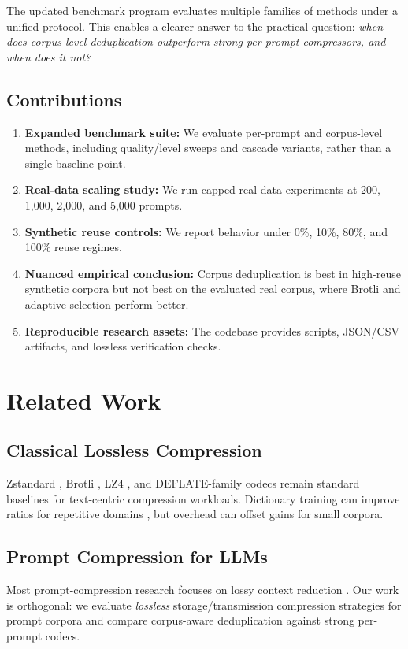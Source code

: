 \documentclass[10pt,conference]{IEEEtran}
\begin{document}
The updated benchmark program evaluates multiple families of methods under a unified protocol. This enables a clearer answer to the practical question: \textit{when does corpus-level deduplication outperform strong per-prompt compressors, and when does it not?}

\subsection{Contributions}
\begin{enumerate}
    \item \textbf{Expanded benchmark suite:} We evaluate per-prompt and corpus-level methods, including quality/level sweeps and cascade variants, rather than a single baseline point.
    \item \textbf{Real-data scaling study:} We run capped real-data experiments at 200, 1,000, 2,000, and 5,000 prompts.
    \item \textbf{Synthetic reuse controls:} We report behavior under 0\%, 10\%, 80\%, and 100\% reuse regimes.
    \item \textbf{Nuanced empirical conclusion:} Corpus deduplication is best in high-reuse synthetic corpora but not best on the evaluated real corpus, where Brotli and adaptive selection perform better.
    \item \textbf{Reproducible research assets:} The codebase provides scripts, JSON/CSV artifacts, and lossless verification checks.
\end{enumerate}

\section{Related Work}
\subsection{Classical Lossless Compression}
Zstandard \cite{zstd2015}, Brotli \cite{brotli2015}, LZ4 \cite{lz4}, and DEFLATE-family codecs remain standard baselines for text-centric compression workloads. Dictionary training can improve ratios for repetitive domains \cite{zstd_dict2020}, but overhead can offset gains for small corpora.

\subsection{Prompt Compression for LLMs}
Most prompt-compression research focuses on lossy context reduction \cite{prompt_compression2023, gisting2024}. Our work is orthogonal: we evaluate \textit{lossless} storage/transmission compression strategies for prompt corpora and compare corpus-aware deduplication against strong per-prompt codecs.
\end{document}
